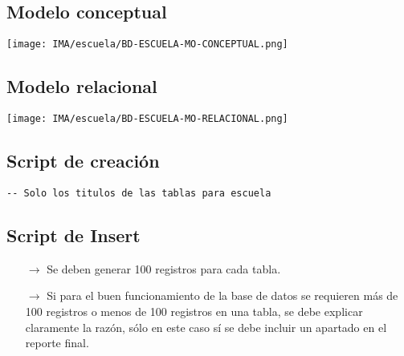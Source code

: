 \subsection{Modelo conceptual}
\begin{center}
    \texttt{[image: IMA/escuela/BD-ESCUELA-MO-CONCEPTUAL.png]}
\end{center}


\subsection{Modelo relacional}
\begin{center}
  \texttt{[image: IMA/escuela/BD-ESCUELA-MO-RELACIONAL.png]}
\end{center}


\subsection{Script de creación}
\begin{lstlisting}[caption={Tablas para la BdDatos}, label={lst:sql_estadios}]
    -- Solo los titulos de las tablas para escuela    
\end{lstlisting}



\subsection{Script de Insert}
\begin{itemize}
    \item[$\rightarrow$] Se deben generar 100 registros para cada tabla.
    \item[$\rightarrow$] Si para el buen funcionamiento de la base de datos se requieren más de 100 registros o
            menos de 100 registros en una tabla, se debe explicar claramente la razón, sólo en este caso
            sí se debe incluir un apartado en el reporte final.
\end{itemize}

